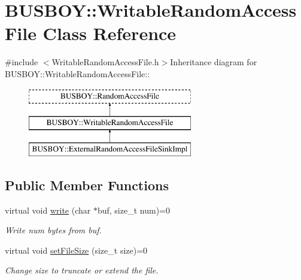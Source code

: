 \hypertarget{classBUSBOY_1_1WritableRandomAccessFile}{
\section{BUSBOY::WritableRandomAccessFile Class Reference}
\label{classBUSBOY_1_1WritableRandomAccessFile}
}


{\ttfamily \#include $<$WritableRandomAccessFile.h$>$}Inheritance diagram for BUSBOY::WritableRandomAccessFile::\begin{figure}[H]
\begin{center}
\leavevmode
\includegraphics[height=3cm]{classBUSBOY_1_1WritableRandomAccessFile}
\end{center}
\end{figure}
\subsection*{Public Member Functions}
\begin{DoxyCompactItemize}
\item 
virtual void \hyperlink{classBUSBOY_1_1WritableRandomAccessFile_a9b0f6b64a1fd45d9405c882dc334b8dd}{write} (char $\ast$buf, size\_\-t num)=0
\begin{DoxyCompactList}\small\item\em Write num bytes from buf. \item\end{DoxyCompactList}\item 
virtual void \hyperlink{classBUSBOY_1_1WritableRandomAccessFile_a6d1605760b7c1f8339a54701f7a6a6fe}{setFileSize} (size\_\-t size)=0
\begin{DoxyCompactList}\small\item\em Change size to truncate or extend the file. \item\end{DoxyCompactList}\end{DoxyCompactItemize}


